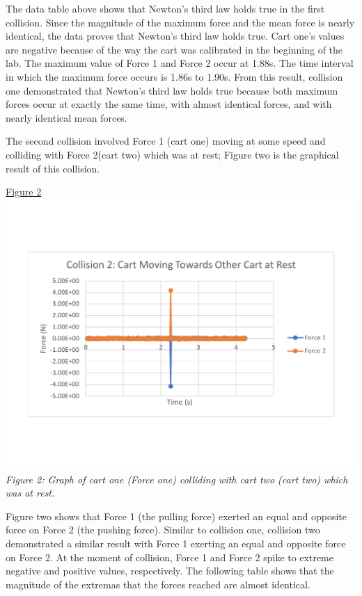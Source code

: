 \documentclass[aps,letterpaper,11pt]{revtex4}
\begin{document}
The data table above shows that Newton's third law holds true in the first collision. Since the magnitude of the maximum force and the mean force is nearly identical, the data proves that Newton's third law holds true. Cart one's values are negative because of the way the cart was calibrated in the beginning of the lab. The maximum value of Force 1 and Force 2 occur at 1.88s. The time interval in which the maximum force occurs is 1.86s to 1.90s. From this result, collision one demonstrated that Newton's third law holds true because both maximum forces occur at exactly the same time, with almost identical forces, and with nearly identical mean forces. 

The second collision involved Force 1 (cart one) moving at some speed and colliding with Force 2(cart two) which was at rest; Figure two is the graphical result of this collision.

\begin{center}
\underline{Figure 2}\\
\vspace{-10mm}
\includegraphics[width=6in]{SeconCollisionGraph.pdf}\\
\textit{Figure 2: Graph of cart one (Force one) colliding with cart two (cart two) which was at rest. }
\end{center}

Figure two shows that Force 1 (the pulling force) exerted an equal and opposite force on Force 2 (the pushing force). Similar to collision one, collision two demonstrated a similar result with Force 1 exerting an equal and opposite force on Force 2. At the moment of collision, Force 1 and Force 2 spike to extreme negative and positive values, respectively. The following table shows that the magnitude of the extremas that the forces reached are almost identical. 
\end{document}
